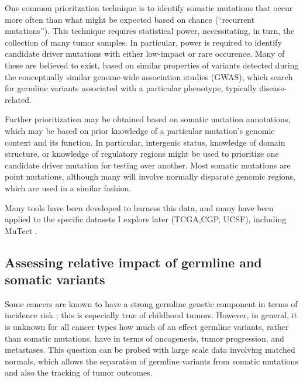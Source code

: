         One common prioritzation technique is to identify somatic
        mutations that occur more often than what might be expected
        based on chance (``recurrent mutations''). This technique
        requires statistical power, necessitating, in turn, the
        collection of many tumor
        samples\cite{leiserson_pan-cancer_2015}. In particular, power
        is required to identify candidate driver mutations with either
        low-impact or rare occurence. Many of these are believed to
        exist, based on similar properties of variants detected during
        the conceptually similar genome-wide association studies
        (GWAS), which search for germline variants associated with a
        particular phenotype, typically disease-related. 
        
        Further prioritization may be obtained based on somatic
        mutation annotations, which may be based on prior knowledge of
        a particular mutation's genomic context and its function. In particular,
        intergenic status, knowledge of domain structure, or knowledge
        of regulatory regions might be used to prioritize one
        candidate driver mutation for testing over another. Most
        somatic mutations are point mutations\cite{lawrence_mutational_2013}, although 
        many will involve normally disparate genomic regions, which
        are used in a similar fashion.

        Many tools have been developed to harness this data, and many
        have been applied to the specific datasets I explore later
        (TCGA,CGP, UCSF), including MuTect
        \cite{cibulskis_sensitive_2013}.


        \subsection{Assessing relative impact of germline and somatic variants}

        Some cancers are known to have a strong germline genetic component in
        terms of incidence risk \cite{stacey_germline_2011}; this is especially true of
        childhood tumors. However, in general, it is unknown for all
        cancer types how much of an effect germline variants, rather
        than somatic mutations, have in terms of oncogenesis,
        tumor progression, and metastases. This question can be probed
        with large scale data        
        involving matched normals, which allows the separation of
        germline variants from somatic mutations and also the tracking
        of tumor outcomes.


